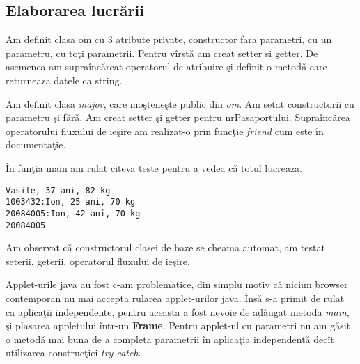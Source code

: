 \subsection{Elaborarea lucr\u{a}rii}
Am definit clasa om cu 3 atribute private, constructor fara parametri, cu un parametru, cu to\c{t}i 
parametrii. Pentru v\^{i}rst\v{a} am creat setter si getter. De asemenea am supra\^{i}nc\v{a}rcat
operatorul de atribuire \c{s}i definit o metod\v{a} care returneaza datele ca string.

Am definit clasa \emph{major}, care mo\c{s}tene\c{s}te public din \emph{om}. Am setat constructorii
cu parametru \c{s}i f\v{a}r\v{a}. Am creat setter \c{s}i getter pentru nrPasaportului. 
Supra\^{i}nc\v{a}rea operatorului fluxului de ie\c{s}ire am realizat-o prin func\c{t}ie \emph{friend}
cum este \^{i}n documenta\c{t}ie.

\^{I}n fun\c{t}ia main am rulat citeva teste pentru a vedea c\v{a} totul lucreaza.
\begin{verbatim}
Vasile, 37 ani, 82 kg
1003432:Ion, 25 ani, 70 kg
20084005:Ion, 42 ani, 70 kg
20084005
\end{verbatim}
Am observat c\v{a} constructorul clasei de baze se cheama automat, am testat seterii, geterii, 
operatorul fluxului de ie\c{s}ire.

Applet-urile java au fost c-am problematice, din simplu motiv c\v{a} niciun browser contemporan
nu mai accepta rularea applet-urilor java. \^{I}ns\v{a} s-a primit de rulat ca aplica\c{t}ii 
independente, pentru aceasta a fost nevoie de ad\v{a}ugat metoda \emph{main}, \c{s}i plasarea
appletului \^{i}ntr-un \textbf{Frame}. Pentru applet-ul cu parametri nu am g\v{a}sit o metod\v{a}
mai buna de a completa parametrii \^{i}n aplica\c{t}ia independent\v{a} dec\^{i}t utilizarea 
construc\c{t}iei \emph{try-catch}.

